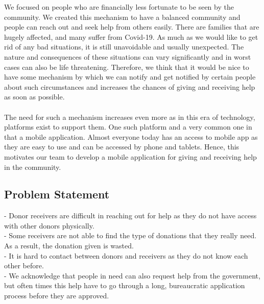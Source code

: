 \documentclass[conference]{IEEEtran}
\begin{document}
    We focused on people who are financially less fortunate  to be seen by the community. We created this mechanism to have a balanced community and people can reach out and seek help from others easily. There are families that are hugely affected, and many suffer from Covid-19. As much as we would like to get rid of any bad situations, it is still unavoidable and usually unexpected. The nature and consequences of these situations can vary significantly and in worst cases can also be life threatening. Therefore, we think that it would be nice to have some mechanism by which we can notify and get notified by certain people about such circumstances and increases the chances of giving and receiving help as soon as possible.
\\ \\
\indent The need for such a mechanism increases even more as in this era of technology, platforms exist to support them. One such platform and a very common one in that a mobile application. Almost everyone today has an access to mobile app as they are easy to use and can be accessed by phone and tablets. Hence, this motivates our team to develop a mobile application for giving and receiving help in the community.
\\
    
\subsection{Problem Statement}

-	Donor receivers are difficult in reaching out for help as they do not have access with other donors physically.\\

-	Some receivers are not able to find the type of donations that they really need. As a result, the donation given is wasted.\\

-	It is hard to contact between donors and receivers as they do not know each other before.\\

- 	We acknowledge that people in need can also request help from the government, but often times this help have to go through a long, bureaucratic application process before they are approved.\\
\end{document}
